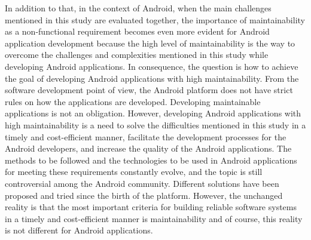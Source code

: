  In addition to that, in the context of Android, when the main challenges mentioned in this study are evaluated together, the importance of maintainability as a non-functional requirement becomes even more evident for Android application development because the high level of maintainability is the way to overcome the challenges and complexities mentioned in this study while developing Android applications. In consequence, the question is how to achieve the goal of developing Android applications with high maintainability. From the software development point of view, the Android platform does not have strict rules on how the applications are developed. Developing maintainable applications is not an obligation. However, developing Android applications with high maintainability is a need to solve the difficulties mentioned in this study in a timely and cost-efficient manner, facilitate the development processes for the Android developers, and increase the quality of the Android applications. The methods to be followed and the technologies to be used in Android applications for meeting these requirements constantly evolve, and the topic is still controversial among the Android community. Different solutions have been proposed and tried since the birth of the platform. However, the unchanged reality is that the most important criteria for building reliable software systems in a timely and cost-efficient manner is maintainability and of course, this reality is not different for Android applications. 